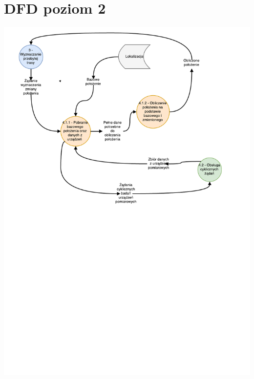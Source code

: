 \documentclass[11pt]{article}
\begin{document}
	\section{DFD poziom 2}
	\begin{center}
		\includegraphics[scale=0.8]{DFD41.pdf}
	\end{center}
	\newpage
\end{document}
